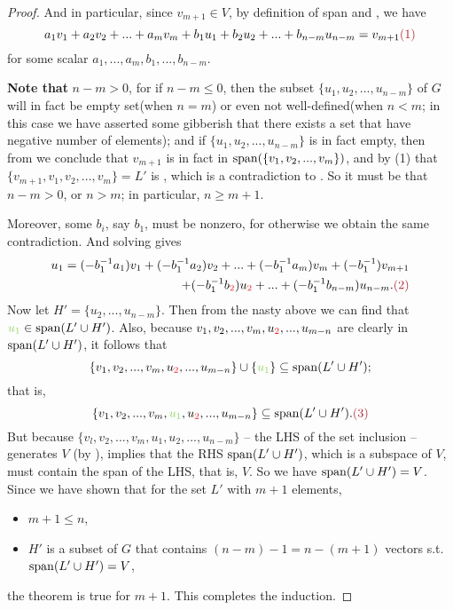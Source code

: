 \begin{proof}
And in particular, since \(v_{m + 1} \in V\), by definition of span and , we have
\[
    a_1 v_1 + a_2 v_2 + ... + a_m v_m + b_1 u_1 + b_2 u_2 + ... + b_{n - m} u_{n - m} = v_{m + 1} \MAROON{(1)}
\]
for some scalar \(a_1, ..., a_m, b_1, ..., b_{n - m}\).

\textbf{Note that} \(n - m > 0\), for if \(n - m \le 0\), then the subset \(\{ u_1, u_2, ..., u_{n - m} \}\) of \(G\) will in fact be empty set(when \(n = m\)) or even not well-defined(when \(n < m\); in this case we have asserted some gibberish that there exists a set that have negative number of elements);
and if \(\{ u_1, u_2, ..., u_{n - m} \}\) is in fact empty, then from  we conclude that \(v_{m + 1}\) is in fact in \(\operatorname{span}(\{ v_1, v_2, ..., v_m \})\), and by (1) that \(\{ v_{m + 1}, v_1, v_2, ..., v_m \} = L'\) is \LDP{}, which is a contradiction to \BLUE{(*)}.
So it must be that \(n - m > 0\), or \(n > m\);
in particular, \(n \ge m + 1\).

Moreover, some \(b_i\), say \(b_1\), must be nonzero, for otherwise we obtain the same contradiction.
And solving  gives
\begin{align*}
    u_1 = (-b_1^{-1} a_1) v_1 + (-b_1^{-1} a_2) v_2 + ... + (-b_1^{-1} a_m) v_m + (-b_1^{-1}) v_{m + 1} \\
        + (-b_1^{-1} b_{\RED{2}}) u_{\RED{2}} + ... + (-b^{-1}_1 b_{n - m}) u_{n - m}. \MAROON{(2)}
\end{align*}
Now let \(H' = \{ u_2, ..., u_{n - m} \}\).
Then from the nasty  above we can find that \(\GREEN{u_1} \in \spann(L' \cup H')\).
Also, because \(v_1, v_2, ..., v_m, u_{\RED{2}}, ..., u_{m - n}\) are clearly in \(\operatorname{span}(L' \cup H')\), it follows that
\[
    \{ v_1, v_2, ..., v_m, u_{\RED{2}}, ..., u_{m - n}\} \cup \{ \GREEN{u_1} \} \subseteq \spann(L' \cup H');
\]
that is,
\[
    \{ v_1, v_2, ..., v_m, \GREEN{u_1}, u_{\RED{2}}, ..., u_{m - n}\} \subseteq \spann(L' \cup H'). \MAROON{(3)}
\]
But because \(\{ v_l, v_2, ..., v_m, u_1, u_2, ..., u_{n - m} \}\) -- the LHS of the set inclusion  -- generates \(V\) (by ),
 implies that the RHS \(\operatorname{span}(L' \cup H')\), which is a subspace of \(V\), must contain the span of the LHS, that is, \(V\).
So we have \(\operatorname{span}(L' \cup H') = V\).
Since we have shown that for the \LID{} set \(L'\) with \(m + 1\) elements,
\begin{itemize}
    \item \(m + 1 \le n\),
    \item \(H'\) is a subset of \(G\) that contains \((n - m) - 1 = n - (m + 1)\) vectors s.t. \(\operatorname{span}(L' \cup H') = V\),
\end{itemize}
the theorem is true for \(m + 1\).
This completes the induction.
\end{proof}

